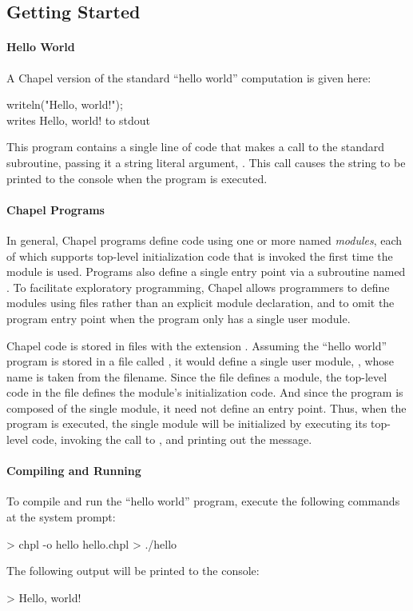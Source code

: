 \subsection{Getting Started}

\paragraph{Hello World}
A Chapel version of the standard ``hello world'' computation is given
here:
\begin{chapel}
writeln("Hello, world!"); \\writes Hello, world! to stdout
\end{chapel}
\noindent This program contains a single line of code that makes a
call to the standard  subroutine, passing it a string
literal argument, .  This call causes the string
to be printed to the console when the program is executed.

\paragraph{Chapel Programs}
In general, Chapel programs define code using one or more named
\emph{modules}, each of which supports top-level initialization code
that is invoked the first time the module is used.  Programs also
define a single entry point via a subroutine named .  To
facilitate exploratory programming, Chapel allows programmers to
define modules using files rather than an explicit module declaration,
and to omit the program entry point when the program only has a single
user module.  

Chapel code is stored in files with the extension .
Assuming the ``hello world'' program is stored in a file called 
, it
would define a single user module, , whose name is taken
from the filename.  Since the file defines a module, the top-level
code in the file defines the module's initialization code.  And since
the program is composed of the single  module, it need not
define an entry point.  Thus, when the program is executed, the single
 module will be initialized by executing its top-level
code, invoking the call to , and printing out the
message.

\paragraph{Compiling and Running}
To compile and run the ``hello world'' program, execute the 
following commands at the system prompt:
\begin{commandline} 
> chpl -o hello hello.chpl
> ./hello
\end{commandline}
The following output will be printed to the console:
\begin{commandline}
> Hello, world!
\end{commandline}

